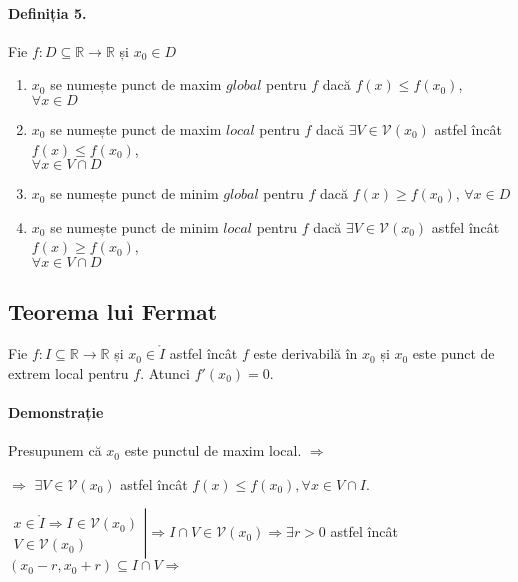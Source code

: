 \paragraph{Definiția 5.}
Fie $f: D \subseteq \mathbb{R} \rightarrow \mathbb{R}$ și $x_{0} \in D$
\begin{enumerate}[label=\emph{\alph*})]
	\item $x_{0}$ se numește punct de maxim $global$ pentru $f$ dacă $f(x) \leq f(x_{0})$, $\forall x \in D$
	\item $x_{0}$ se numește punct de maxim $local$ pentru $f$ dacă $\exists V \in \mathcal{V}(x_{0})$ astfel încât $f(x) \leq f(x_{0})$,\\ $\forall x \in V \cap D$
	\item $x_{0}$ se numește punct de minim $global$ pentru $f$ dacă $f(x) \geq f(x_{0})$, $\forall x \in D$
	\item $x_{0}$ se numește punct de minim $local$ pentru $f$ dacă $\exists V \in \mathcal{V}(x_{0})$ astfel încât $f(x) \geq f(x_{0})$,\\ $\forall x \in V \cap D$
\end{enumerate}

\subsection{Teorema lui Fermat}
Fie $f:I \subseteq \mathbb{R} \rightarrow \mathbb{R}$ și $x_{0} \in \mathring{I}$ astfel încât $f$ este derivabilă în $x_{0}$ și $x_{0}$ este punct de extrem local pentru $f$. Atunci $f'(x_{0}) = 0$.

\paragraph{Demonstrație}
Presupunem că $x_{0}$ este punctul de maxim local. $\Rightarrow$

$\Rightarrow$ $\exists V \in \mathcal{V}(x_{0})$ astfel încât $f(x) \leq f(x_{0}), \forall x \in V \cap I$.

\vspace{10pt}

$
	    \left.
		\begin{array}{rl}
			x \in \mathring{I} \Rightarrow I \in \mathcal{V}(x_{0}) \\
			V \in \mathcal{V}(x_{0})
		\end{array} \right|
		\Rightarrow I \cap V \in \mathcal{V}(x_{0}) \Rightarrow \exists r>0$ astfel încât $(x_{0} - r, x_{0} + r) \subseteq I \cap V \Rightarrow
$

